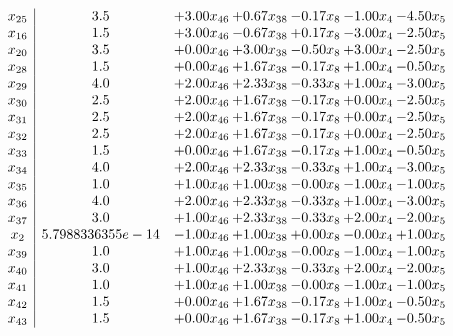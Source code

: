 \documentclass[8pt]{article}
\begin{document}
\[\begin{array}{c| c c@{\hskip 2pt} c@{\hskip 2pt} c@{\hskip 2pt} c@{\hskip 2pt} c@{\hskip 2pt} }
 x_{25}   &  3.5 & +  3.00 x_{46} & +  0.67 x_{38} & -0.17 x_{8} & -1.00 x_{4} & -4.50 x_{5}\\
 x_{16}   &  1.5 & +  3.00 x_{46} & -0.67 x_{38} & +  0.17 x_{8} & -3.00 x_{4} & -2.50 x_{5}\\
 x_{20}   &  3.5 & +  0.00 x_{46} & +  3.00 x_{38} & -0.50 x_{8} & +  3.00 x_{4} & -2.50 x_{5}\\
 x_{28}   &  1.5 & +  0.00 x_{46} & +  1.67 x_{38} & -0.17 x_{8} & +  1.00 x_{4} & -0.50 x_{5}\\
 x_{29}   &  4.0 & +  2.00 x_{46} & +  2.33 x_{38} & -0.33 x_{8} & +  1.00 x_{4} & -3.00 x_{5}\\
 x_{30}   &  2.5 & +  2.00 x_{46} & +  1.67 x_{38} & -0.17 x_{8} & +  0.00 x_{4} & -2.50 x_{5}\\
 x_{31}   &  2.5 & +  2.00 x_{46} & +  1.67 x_{38} & -0.17 x_{8} & +  0.00 x_{4} & -2.50 x_{5}\\
 x_{32}   &  2.5 & +  2.00 x_{46} & +  1.67 x_{38} & -0.17 x_{8} & +  0.00 x_{4} & -2.50 x_{5}\\
 x_{33}   &  1.5 & +  0.00 x_{46} & +  1.67 x_{38} & -0.17 x_{8} & +  1.00 x_{4} & -0.50 x_{5}\\
 x_{34}   &  4.0 & +  2.00 x_{46} & +  2.33 x_{38} & -0.33 x_{8} & +  1.00 x_{4} & -3.00 x_{5}\\
 x_{35}   &  1.0 & +  1.00 x_{46} & +  1.00 x_{38} & -0.00 x_{8} & -1.00 x_{4} & -1.00 x_{5}\\
 x_{36}   &  4.0 & +  2.00 x_{46} & +  2.33 x_{38} & -0.33 x_{8} & +  1.00 x_{4} & -3.00 x_{5}\\
 x_{37}   &  3.0 & +  1.00 x_{46} & +  2.33 x_{38} & -0.33 x_{8} & +  2.00 x_{4} & -2.00 x_{5}\\
 x_{2}   &  5.7988336355e-14 & -1.00 x_{46} & +  1.00 x_{38} & +  0.00 x_{8} & -0.00 x_{4} & +  1.00 x_{5}\\
 x_{39}   &  1.0 & +  1.00 x_{46} & +  1.00 x_{38} & -0.00 x_{8} & -1.00 x_{4} & -1.00 x_{5}\\
 x_{40}   &  3.0 & +  1.00 x_{46} & +  2.33 x_{38} & -0.33 x_{8} & +  2.00 x_{4} & -2.00 x_{5}\\
 x_{41}   &  1.0 & +  1.00 x_{46} & +  1.00 x_{38} & -0.00 x_{8} & -1.00 x_{4} & -1.00 x_{5}\\
 x_{42}   &  1.5 & +  0.00 x_{46} & +  1.67 x_{38} & -0.17 x_{8} & +  1.00 x_{4} & -0.50 x_{5}\\
 x_{43}   &  1.5 & +  0.00 x_{46} & +  1.67 x_{38} & -0.17 x_{8} & +  1.00 x_{4} & -0.50 x_{5}\\

\end{array}\]
\end{document}
